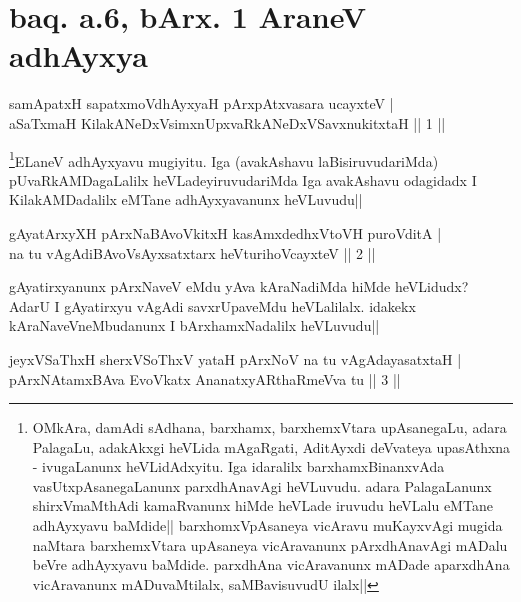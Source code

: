 \section*{baq. a.6, bArx. 1 AraneV adhAyxya}

\begin{shl}
samApatxH sapatxmoV\s dhAyxyaH pArxpAtxvasara ucayxteV | \\
aSaTxmaH KilakANeDxV\s simxnUpxvaRkANeDxVSavxnukitxtaH \hfill|| 1 || 
\end{shl}

\begin{artha} 
\footnote[1]{OMkAra, damAdi sAdhana, barxhamx, barxhemxVtara 
upAsanegaLu, adara PalagaLu, adakAkxgi heVLida mAgaRgati, AditAyxdi 
deVvateya upasAthxna - ivugaLanunx heVLidAdxyitu. Iga idaralilx 
barxhamxBinanxvAda vasUtxpAsanegaLanunx parxdhAnavAgi heVLuvudu. adara 
PalagaLanunx shirxVmaMthAdi kamaRvanunx hiMde heVLade iruvudu heVLalu 
eMTane adhAyxyavu baMdide|| barxhomxVpAsaneya vicAravu muKayxvAgi 
mugida naMtara barxhemxVtara upAsaneya vicAravanunx pArxdhAnavAgi 
mADalu beVre adhAyxyavu baMdide. parxdhAna vicAravanunx mADade 
aparxdhAna vicAravanunx mADuvaMtilalx, saMBavisuvudU ilalx||}ELaneV adhAyxyavu mugiyitu. Iga (avakAshavu 
laBisiruvudariMda) pUvaRkAMDagaLalilx heVLadeyiruvudariMda Iga 
avakAshavu odagidadx I KilakAMDadalilx eMTane adhAyxyavanunx 
heVLuvudu||
\end{artha}


\begin{shl}
gAyatArxyXH pArxNaBAvoVkitxH kasAmxdedhxVtoVH puroVditA | \\
na tu vAgAdiBAvoV\s sAyxsatxtarx heVturihoVcayxteV \hfill|| 2 || 
\end{shl}

\begin{artha} 
gAyatirxyanunx pArxNaveV eMdu yAva kAraNadiMda hiMde heVLidudx? AdarU 
I gAyatirxyu vAgAdi savxrUpaveMdu heVLalilalx. idakekx 
kAraNaveVneMbudanunx I bArxhamxNadalilx heVLuvudu||
\end{artha}

\begin{shl}
jeyxVSaThxH sherxVSoThxV yataH pArxNoV na tu vAgAdayasatxtaH | \\
pArxNAtamxBAva EvoVkatx AnanatxyARthaRmeVva tu \hfill|| 3 || 
\end{shl}

